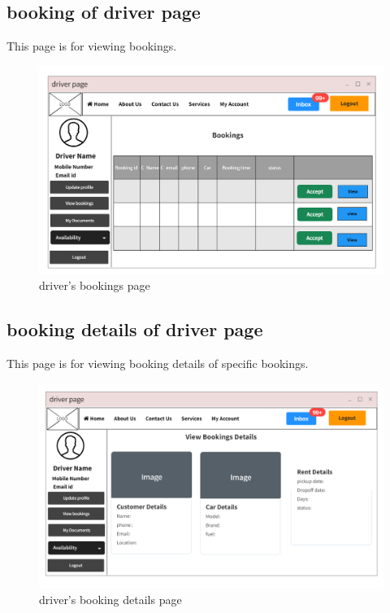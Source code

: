 \documentclass[a4paper,12pt,toc=flat]{report}
\begin{document}
	\pagebreak
	
			\subsection{booking of driver page}
\hspace*{12pt}
        This page is for viewing  bookings.
	\begin{figure}[bph]
	\begin{center}
		\includegraphics[width=1.1 \linewidth, height=0.7\textheight]{"driver_bookings.png"}
	\end{center}
		\caption{ driver's bookings page}
	\end{figure}

	\pagebreak
	
		\subsection{booking details of driver page}
\hspace*{12pt}
        This page is for viewing booking details of specific bookings.
	\begin{figure}[bph]
	\begin{center}
		\includegraphics[width=1.1 \linewidth, height=0.7\textheight]{"driver_booking_details.png"}
	\end{center}
		\caption{ driver's booking details page}
	\end{figure}
\end{document}
